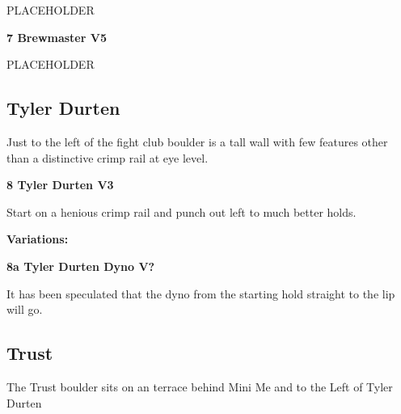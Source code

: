 \begin{multicols}{2}
\begin{minipage}{\linewidth}
					\begin{adjustwidth}{0.5cm}{}				
					PLACEHOLDER
					\end{adjustwidth}
					\end{minipage}
					\begin{minipage}{\linewidth}	
					\label{rt:Brewmaster}
\colorbox{RoyalBlue!20}{
\textbf{
7 Brewmaster V5    
}
}

					\begin{adjustwidth}{0.5cm}{}				
					PLACEHOLDER
					\end{adjustwidth}
					\end{minipage}
			\subsection*{Tyler Durten}\label{bf:Tyler Durten}
			\begin{minipage}{\columnwidth}
			Just to the left of the fight club boulder is a tall wall with few features other than a distinctive crimp rail at eye level.
			\end{minipage}
			
					\begin{minipage}{\linewidth}	
					\label{rt:Tyler Durten}
\colorbox{green!20}{
\textbf{
8 Tyler Durten V3   
}
}

					\begin{adjustwidth}{0.5cm}{}				
					Start on a henious crimp rail and punch out left to much better holds.
					\end{adjustwidth}
					\end{minipage}
						\begin{adjustwidth}{0.5cm}{}				
						\textbf{Variations:} \newline
							\begin{minipage}{\linewidth}	
							\label{vr:Tyler Durten Dyno}
\colorbox{black!20}{
\textbf{
8a Tyler Durten Dyno V?  
}
}

							\begin{adjustwidth}{0.5cm}{}				
							It has been speculated that the dyno from the starting hold straight to the lip will go.
							\end{adjustwidth}
							\end{minipage}
						\end{adjustwidth}
			\subsection*{Trust}\label{bf:Trust}
			\begin{minipage}{\columnwidth}
			The Trust boulder sits on an terrace behind Mini Me and to the Left of Tyler Durten
			\end{minipage}
			

\end{multicols}
